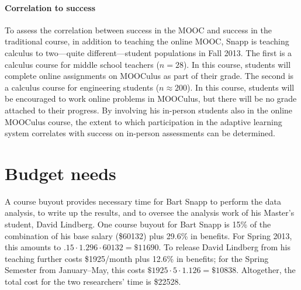 \documentclass[12pt]{article}
\begin{document}
\paragraph{Correlation to success}

To assess the correlation between success in the MOOC and success in
the traditional course, in addition to teaching the online MOOC, Snapp
is teaching calculus to two---quite different---student populations in
Fall 2013.  The first is a calculus course for middle school teachers
($n=28$). In this course, students will complete online assignments on
MOOCulus as part of their grade.  The second is a calculus course for
engineering students ($n\approx 200$).  In this course, students will
be encouraged to work online problems in MOOCulus, but there will be
no grade attached to their progress.  By involving his in-person
students also in the online MOOCulus course, the extent to which
participation in the adaptive learning system correlates with success
on in-person assessments can be determined.

\section{Budget needs}
A course buyout provides necessary time for Bart Snapp to perform the
data analysis, to write up the results, and to oversee the analysis
work of his Master's student, David Lindberg.  One course buyout for
Bart Snapp is 15\% of the combination of his base salary (\$60132)
plus 29.6\% in benefits. For Spring 2013, this amounts to $.15 \cdot
1.296\cdot 60132=\$11690$.  To release David Lindberg from his
teaching further costs \$1925/month plus 12.6\% in benefits; for the
Spring Semester from January--May, this costs $\$1925 \cdot 5 \cdot
1.126 = \$10838$.  Altogether, the total cost for the two researchers'
time is \$22528.


\pagebreak
\printbibliography
\end{document}
